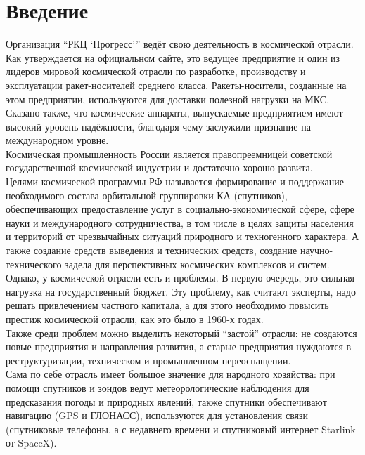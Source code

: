 \renewcommand{\baselinestretch}{1.5}
\section*{Введение}

Организация \enquote{РКЦ \enquote{Прогресс}} ведёт свою деятельность в космической отрасли.\\
Как утверждается на официальном сайте, это ведущее предприятие и один из лидеров мировой космической отрасли по разработке, производству и эксплуатации ракет-носителей среднего класса. Ракеты-носители, созданные на этом предприятии, используются для доставки полезной нагрузки на МКС. Сказано также, что космические аппараты, выпускаемые предприятием имеют высокий уровень надёжности, благодаря чему заслужили признание на международном уровне.\\
Космическая промышленность России является правопреемницей советской государственной космической индустрии и достаточно хорошо развита.\\
Целями космической программы РФ называется формирование и поддержание необходимого состава орбитальной группировки КА (спутников), обеспечивающих предоставление услуг в социально-экономической сфере, сфере науки и международного сотрудничества, в том числе в целях защиты населения и территорий от чрезвычайных ситуаций природного и техногенного характера. А также создание средств выведения и технических средств, создание научно-технического задела для перспективных космических комплексов и систем.\\
Однако, у космической отрасли есть и проблемы. В первую очередь, это сильная нагрузка на государственный бюджет. Эту проблему, как считают эксперты, надо решать привлечением частного капитала, а для этого необходимо повысить престиж космической отрасли, как это было в 1960-х годах.\\
Также среди проблем можно выделить некоторый \enquote{застой} отрасли: не создаются новые предприятия и направления развития, а старые предприятия нуждаются в реструктуризации, техническом и промышленном переоснащении.\\
Сама по себе отрасль имеет большое значение для народного хозяйства: при помощи спутников и зондов ведут метеорологические наблюдения для предсказания погоды и природных явлений, также спутники обеспечивают навигацию (GPS и ГЛОНАСС), используются для установления связи (спутниковые телефоны, а с недавнего времени и спутниковый интернет Starlink от SpaceX).\\

